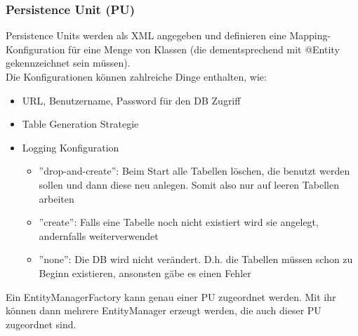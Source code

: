 \subsubsection*{Persistence Unit (PU)}
Persistence Units werden als XML angegeben und definieren eine Mapping-Konfiguration für eine Menge von Klassen (die dementsprechend mit @Entity gekennzeichnet sein müssen).\\
Die Konfigurationen können zahlreiche Dinge enthalten, wie:
\begin{itemize}
    \item URL, Benutzername, Password für den DB Zugriff
    \item Table Generation Strategie
    \item Logging Konfiguration
          \begin{itemize}
              \item ''drop-and-create'': Beim Start alle Tabellen löschen, die benutzt werden sollen und dann diese neu anlegen. Somit also nur auf leeren Tabellen arbeiten
              \item ''create'': Falls eine Tabelle noch nicht existiert wird sie angelegt, andernfalls weiterverwendet
              \item ''none'': Die DB wird nicht verändert. D.h. die Tabellen müssen schon zu Beginn existieren, ansonsten gäbe es einen Fehler
          \end{itemize}
\end{itemize}

Ein EntityManagerFactory kann genau einer PU zugeordnet werden. Mit ihr können dann mehrere EntityManager erzeugt werden, die auch dieser PU zugeordnet sind.

